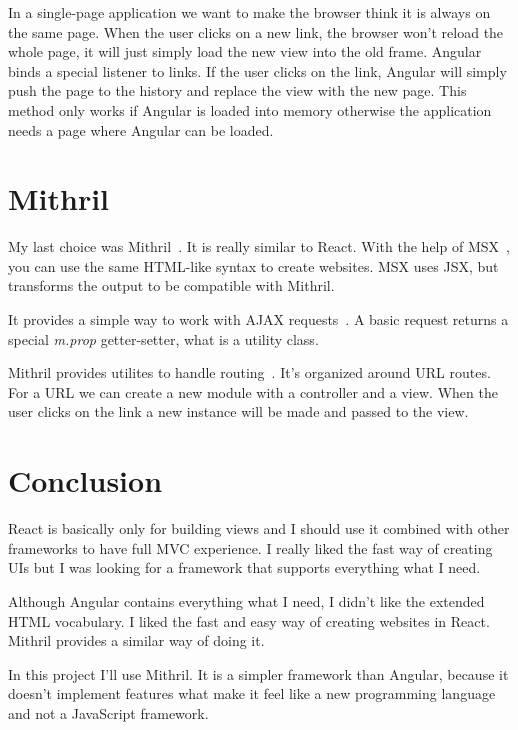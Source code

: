 In a single-page application we want to make the browser think it is always on the same page. When the user clicks on a new link, the browser won't reload the whole page, it will just simply load the new view into the old frame. Angular binds a special listener to links. If the user clicks on the link, Angular will simply push the page to the history and replace the view with the new page. This method only works if Angular is loaded into memory otherwise the application needs a page where Angular can be loaded.


\section{Mithril}

My last choice was Mithril~\cite{Mithril}. It is really similar to React. With the help of MSX~\cite{MSX}, you can use the same HTML-like syntax to create websites. MSX uses JSX, but transforms the output to be compatible with Mithril. 

It provides a simple way to work with AJAX requests~\cite{Mithril-request}. A basic request returns a special \emph{m.prop} getter-setter, what is a utility class.

Mithril provides utilites to handle routing~\cite{Mithril-routing}. It's organized around URL routes. For a URL we can create a new module with a controller and a view. When the user clicks on the link a new instance will be made and passed to the view.

\section{Conclusion}

React is basically only for building views and I should use it combined with other frameworks to have full MVC experience. I really liked the fast way of creating UIs but I was looking for a framework that supports everything what I need. 

Although Angular contains everything what I need, I didn't like the extended HTML vocabulary. I liked the fast and easy way of creating websites in React. Mithril provides a similar way of doing it. 

In this project I'll use Mithril. It is a simpler framework than Angular, because it doesn't implement features what make it feel like a new programming language and not a JavaScript framework.

